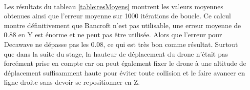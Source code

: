             \begin{table}[H]
                \caption{\label{table:resAll}Résultats obtenus avec Bancroft et Decawave}
            \end{table}
            
             \paragraph*{}
            Les résultats du tableau \ref{table:resMoyens} montrent les valeurs moyennes obtenues ainsi que l'erreur moyenne sur 1000 itérations de boucle. Ce calcul montre définitivement que Bancroft n'est pas utilisable, une erreur moyenne de 0.88 en Y est énorme et ne peut pas être utilisée. Alors que l'erreur pour Decawave ne dépasse pas les 0.08, ce qui est très bon comme résultat. Surtout que dans la suite du stage, la hauteur de déplacement du drone n'était pas forcément prise en compte car on peut également fixer le drone à une altitude de déplacement suffisamment haute pour éviter toute collision et le faire avancer en ligne droite sans devoir se repositionner en Z.
            

